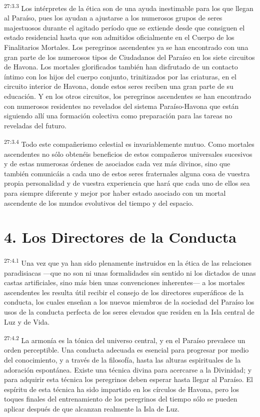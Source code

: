 \par
\textsuperscript{27:3.3} Los intérpretes de la ética son de una ayuda inestimable para los que llegan al Paraíso, pues los ayudan a ajustarse a los numerosos grupos de seres majestuosos durante el agitado período que se extiende desde que consiguen el estado residencial hasta que son admitidos oficialmente en el Cuerpo de los Finalitarios Mortales. Los peregrinos ascendentes ya se han encontrado con una gran parte de los numerosos tipos de Ciudadanos del Paraíso en los siete circuitos de Havona. Los mortales glorificados también han disfrutado de un contacto íntimo con los hijos del cuerpo conjunto, trinitizados por las criaturas, en el circuito interior de Havona, donde estos seres reciben una gran parte de su educación. Y en los otros circuitos, los peregrinos ascendentes se han encontrado con numerosos residentes no revelados del sistema Paraíso-Havona que están siguiendo allí una formación colectiva como preparación para las tareas no reveladas del futuro.

\par
\textsuperscript{27:3.4} Todo este compañerismo celestial es invariablemente mutuo. Como mortales ascendentes no sólo obtenéis beneficios de estos compañeros universales sucesivos y de estas numerosas órdenes de asociados cada vez más divinos, sino que también comunicáis a cada uno de estos seres fraternales alguna cosa de vuestra propia personalidad y de vuestra experiencia que hará que cada uno de ellos sea para siempre diferente y mejor por haber estado asociado con un mortal ascendente de los mundos evolutivos del tiempo y del espacio.

\section*{4. Los Directores de la Conducta}
\par
\textsuperscript{27:4.1} Una vez que ya han sido plenamente instruidos en la ética de las relaciones paradisiacas ---que no son ni unas formalidades sin sentido ni los dictados de unas castas artificiales, sino más bien unas convenciones inherentes--- a los mortales ascendentes les resulta útil recibir el consejo de los directores superáficos de la conducta, los cuales enseñan a los nuevos miembros de la sociedad del Paraíso los usos de la conducta perfecta de los seres elevados que residen en la Isla central de Luz y de Vida.

\par
\textsuperscript{27:4.2} La armonía es la tónica del universo central, y en el Paraíso prevalece un orden perceptible. Una conducta adecuada es esencial para progresar por medio del conocimiento, y a través de la filosofía, hasta las alturas espirituales de la adoración espontánea. Existe una técnica divina para acercarse a la Divinidad; y para adquirir esta técnica los peregrinos deben esperar hasta llegar al Paraíso. El espíritu de esta técnica ha sido impartido en los círculos de Havona, pero los toques finales del entrenamiento de los peregrinos del tiempo sólo se pueden aplicar después de que alcanzan realmente la Isla de Luz.

